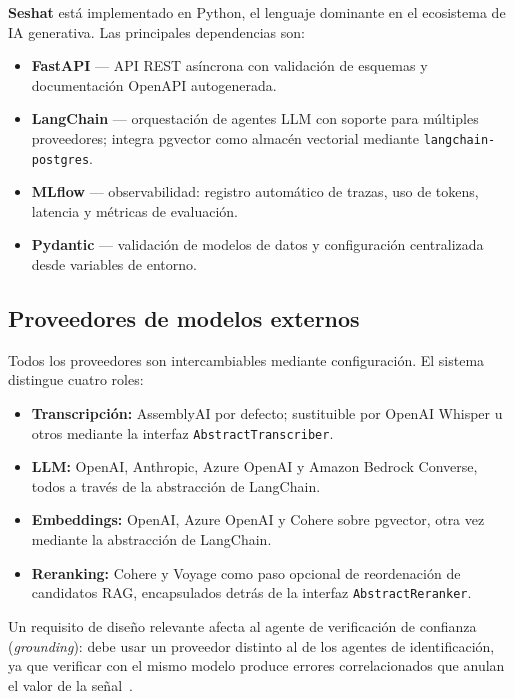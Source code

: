 \textbf{Seshat} está implementado en Python, el lenguaje dominante en el ecosistema de IA
generativa. Las principales dependencias son:

\begin{itemize}
  \item \textbf{FastAPI} — API REST asíncrona con validación de esquemas y documentación OpenAPI autogenerada.
  \item \textbf{LangChain} — orquestación de agentes LLM con soporte para múltiples proveedores; integra pgvector como almacén vectorial mediante \texttt{langchain-postgres}.
  \item \textbf{MLflow} — observabilidad: registro automático de trazas, uso de tokens, latencia y métricas de evaluación.
  \item \textbf{Pydantic} — validación de modelos de datos y configuración centralizada desde variables de entorno.
\end{itemize}

\subsection{Proveedores de modelos externos}

Todos los proveedores son intercambiables mediante configuración. El sistema distingue cuatro
roles:

\begin{itemize}
  \item \textbf{Transcripción:} AssemblyAI por defecto; sustituible por OpenAI Whisper u otros
        mediante la interfaz \texttt{AbstractTranscriber}.

  \item \textbf{LLM:} OpenAI, Anthropic, Azure OpenAI y Amazon Bedrock Converse, todos a través
        de la abstracción de LangChain.

  \item \textbf{Embeddings:} OpenAI, Azure OpenAI y Cohere sobre pgvector, otra vez mediante la
        abstracción de LangChain.

  \item \textbf{Reranking:} Cohere y Voyage como paso opcional de reordenación de candidatos
        RAG, encapsulados detrás de la interfaz \texttt{AbstractReranker}.
\end{itemize}

Un requisito de diseño relevante afecta al agente de verificación de confianza
(\textit{grounding}): debe usar un proveedor distinto al de los agentes de identificación, ya que
verificar con el mismo modelo produce errores correlacionados que anulan el valor de la
señal~\cite{zheng2023judging,cohen2023lmvslm}.

